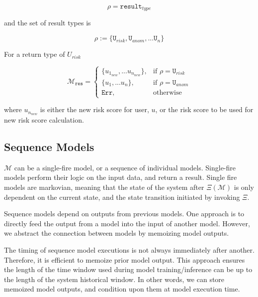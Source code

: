 \documentclass[10pt, titlepage, twocolumn]{article}
\begin{document}
\begin{equation}
\rho = \texttt{result}_{type} 
\end{equation}

and the set of result types is

\begin{equation}
\rho := \{ \texttt{U}_{risk}, \texttt{U}_{anom}, ... \texttt{U}_{n} \} 
\end{equation}

For a return type of \(U_{risk}\)

\begin{equation}
\boldsymbol{\mathcal{M}}_{\texttt{res}} =
\begin{cases}

    \{u_{1_{new}}, ... u_{n_{new}} \},		   
    & \text{if } \rho = \texttt{U}_{risk}\\
    
    \{u_1, ... u_n \},		   
    & \text{if } \rho = \texttt{U}_{anom}\\
    
    \texttt{Err},              							   
    & \text{otherwise}
    
\end{cases}
\end{equation}

where \(u_{n_{new}}\) is either the new risk score for user, \(u\), or the risk score to be used for new risk score calculation. 



\subsection{Sequence Models}
\(\boldsymbol{\mathcal{M}}\) can be a single-fire model, or a sequence of individual models. Single-fire models perform their logic on the input data, and return a result. Single fire models are markovian, meaning that the state of the system after \( \Xi ( \boldsymbol{\mathcal{M}} ) \) is only dependent on the current state, and the state transition initiated by invoking \(\Xi\).

Sequence models depend on outputs from previous models. One approach is to directly feed the output from a model into the input of another model. However, we abstract the connection between models by memoizing model outputs. 


The timing of sequence model executions is not always immediately after another. Therefore, it is efficient to memoize prior model output. This approach ensures the length of the time window used during model training/inference can be up to the length of the system historical window. In other words, we can store memoized model outputs, and condition upon them at model execution time.   
\end{document}
